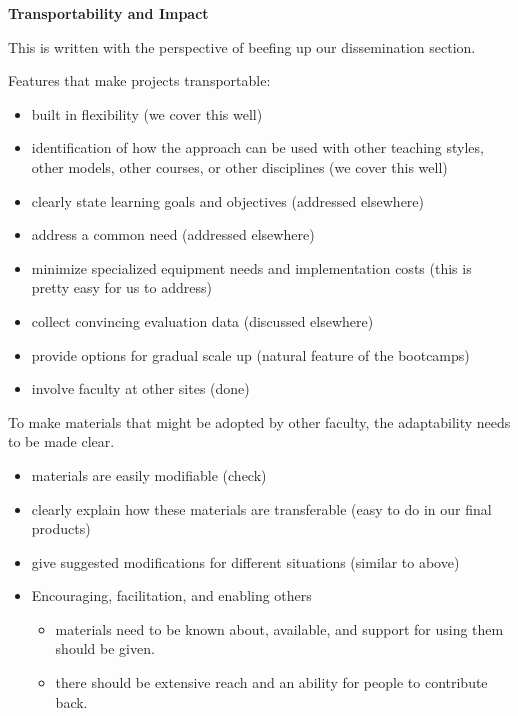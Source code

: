 \documentclass[12pt]{article}
\begin{document}
\vspace{2em}
\noindent \textbf{Transportability and Impact}

\vspace{1em}
\noindent This is written with the perspective of beefing up our dissemination section.

\vspace{1em}
\noindent Features that make projects transportable:
\begin{itemize}
\item built in flexibility (we cover this well)
\item identification of how the approach can be used with other teaching
  styles, other models, other courses, or other disciplines (we cover this
  well)
\item clearly state learning goals and objectives (addressed elsewhere)
\item address a common need (addressed elsewhere)
\item minimize specialized equipment needs and implementation costs (this is
  pretty easy for us to address)
\item collect convincing evaluation data (discussed elsewhere)
\item provide options for gradual scale up (natural feature of the bootcamps)
\item involve faculty at other sites (done)
\end{itemize}

\vspace{1em}
\noindent To make materials that might be adopted by other faculty, the adaptability
needs to be made clear. 
\begin{itemize}
\item materials are easily modifiable (check)
\item clearly explain how these materials are transferable (easy to do in our
  final products)
\item give suggested modifications for different situations (similar to
  above)
\item Encouraging, facilitation, and enabling others 
  \begin{itemize}
  \item materials need to be known about, available, and support for using
    them should be given. 
  \item there should be extensive reach and an ability for people to
    contribute back.
  \end{itemize}
\end{itemize}
\end{document}
